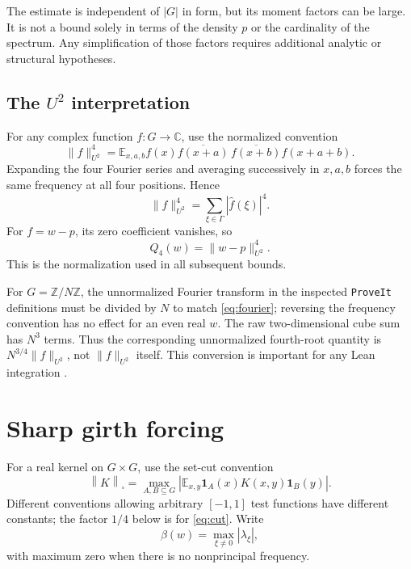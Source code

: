 \documentclass[11pt]{article}
\numberwithin{equation}{section}
\theoremstyle{definition}
\theoremstyle{remark}
\newcommand{\E}{\mathbb E}
\newcommand{\Z}{\mathbb Z}
\newcommand{\C}{\mathbb C}
\newcommand{\one}{\mathbf 1}
\newcommand{\Cut}[1]{\left\|#1\right\|_{\square}}
\begin{document}
The estimate is independent of $|G|$ in form, but its moment factors can
be large. It is not a bound solely in terms of the density $p$ or the
cardinality of the spectrum. Any simplification of those factors requires
additional analytic or structural hypotheses.

\subsection{The $U^2$ interpretation}

For any complex function $f:G\to\C$, use the normalized convention
\begin{equation}
 \|f\|_{U^2}^4=
 \E_{x,a,b}f(x)\overline{f(x+a)}\,
                 \overline{f(x+b)}f(x+a+b).
 \label{eq:u2}
\end{equation}
Expanding the four Fourier series and averaging successively in $x,a,b$
forces the same frequency at all four positions. Hence
\begin{equation}
 \|f\|_{U^2}^4=\sum_{\xi\in\Gamma}|\widehat f(\xi)|^4.
 \label{eq:u2-fourier}
\end{equation}
For $f=w-p$, its zero coefficient vanishes, so
\begin{equation}
 Q_4(w)=\|w-p\|_{U^2}^4.
 \label{eq:Q4-U2}
\end{equation}
This is the normalization used in all subsequent bounds.

For $G=\Z/N\Z$, the unnormalized Fourier transform in the inspected
\texttt{ProveIt} definitions must be divided by $N$ to match
\eqref{eq:fourier}; reversing the frequency convention has no effect
for an even real $w$. The raw two-dimensional cube sum has $N^3$
terms. Thus the corresponding unnormalized fourth-root quantity is
$N^{3/4}\|f\|_{U^2}$, not $\|f\|_{U^2}$ itself. This conversion is
important for any Lean integration \cite{ProveItDefinitions}.

\section{Sharp girth forcing}
\label{sec:forcing}

For a real kernel on $G\times G$, use the set-cut convention
\begin{equation}
 \Cut{K}=\max_{A,B\subseteq G}
    \left|\E_{x,y}\one_A(x)K(x,y)\one_B(y)\right|.
 \label{eq:cut}
\end{equation}
Different conventions allowing arbitrary $[-1,1]$ test functions have
different constants; the factor $1/4$ below is for \eqref{eq:cut}.
Write
\begin{equation}
 \beta(w)=\max_{\xi\ne0}|\lambda_\xi|,
 \label{eq:beta}
\end{equation}
with maximum zero when there is no nonprincipal frequency.
\end{document}
